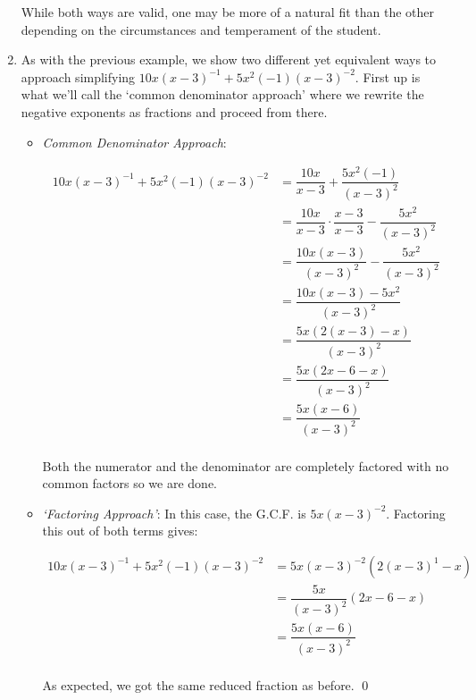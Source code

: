\begin{ex}
\begin{enumerate}
While both ways are valid, one may be more of a natural fit than the other depending on the circumstances and temperament of the student.

\item As with the previous example, we show two different yet equivalent ways to approach simplifying $10x(x-3)^{-1} + 5x^2(-1)(x-3)^{-2}$. First up is what we'll call the `common denominator approach' where we rewrite the negative exponents as fractions and proceed from there.

\begin{itemize}

\item  \textit{Common Denominator Approach}:

\begin{align*}
10x(x-3)^{-1} + 5x^2(-1)(x-3)^{-2} & = \dfrac{10x}{x-3} + \dfrac{5x^2(-1)}{(x-3)^2} \\ 
& = \dfrac{10x}{x-3} \cdot \dfrac{x-3}{x-3} - \dfrac{5x^2}{(x-3)^2} \tag{Equivalent Fractions} \\ 
& = \dfrac{10x(x-3)}{(x-3)^2} - \dfrac{5x^2}{(x-3)^2} \tag{Multiply} \\ 
& = \dfrac{10x(x-3) - 5x^2}{(x-3)^2} \tag{Subtract} \\ 
& = \dfrac{5x(2(x-3) - x)}{(x-3)^2} \tag{Factor out G.C.F.} \\ 
& = \dfrac{5x(2x-6-x)}{(x-3)^2} \tag{Distribute} \\ 
& = \dfrac{5x(x-6)}{(x-3)^2} \tag{Combine like terms} \\
\end{align*}

Both the numerator and the denominator are completely factored with no common factors so we are done.

\item  \textit{`Factoring Approach'}: In this case, the G.C.F. is $5x(x-3)^{-2}$.  Factoring this out of both terms gives:

\begin{align*}
10x(x-3)^{-1} + 5x^2(-1)(x-3)^{-2} & = 5x(x-3)^{-2}(2(x-3)^{1} - x) \tag{Factor} \\ 
& = \dfrac{5x}{(x-3)^2} (2x-6 - x) \tag{Rewrite, distribute}\\ 
& = \dfrac{5x(x-6)}{(x-3)^2} \tag{Multiply}\\
\end{align*}

As expected, we got the same reduced fraction as before. \qed
\end{itemize}
																
\end{enumerate}

\end{ex}

